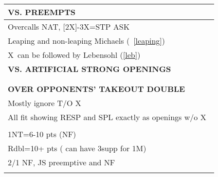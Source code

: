 \documentclass{article}
\newcommand\X{{\footnotesize X}}
\begin{document}
{\begin{minipage}{90mm}
\begin{tabular}{| p{88mm} |}
		\textbf{VS. PREEMPTS} \\ \hline
                Overcalls NAT, [2X]-3X=STP ASK
		\\ \hline
                Leaping and non-leaping Michaels (~\ref{leaping})
		\\ \hline
                \X\ can be followed by Lebensohl (\ref{leb})
		\\ \hline
		\textbf{VS. ARTIFICIAL STRONG OPENINGS} \\ \hline
		\\ \hline
		\\ \hline
		\textbf{OVER OPPONENTS' TAKEOUT DOUBLE} \\ \hline
                Mostly ignore T/O \X\
		\\ \hline
                All fit showing RESP and SPL
                exactly as openings w/o \X\
		\\ \hline
		\\ \hline
                1NT=6-10 pts (NF)
		\\ \hline
                Rdbl=10+ pts ( can have 3supp for 1M)
		\\ \hline
                2/1 NF, JS preemptive and  NF
		\\ \hline
		\\ \hline
	\end{tabular}
\end{minipage}
}
\begin{minipage}{5mm}
	\begin{tabular}{| p{5mm} |}
	\end{tabular}
\end{minipage}
\end{document}

